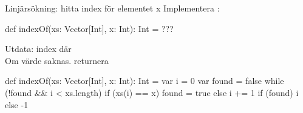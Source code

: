 %

\begin{Slide}{Linjärsökning: hitta index för elementet x}
Implementera :
\begin{Code}
def indexOf(xs: Vector[Int], x: Int): Int = ???
\end{Code}
Utdata: index  där \\Om värde saknas. returnera 
\pause
\begin{Code}
def indexOf(xs: Vector[Int], x: Int): Int = {
  var i = 0
  var found = false
  while (!found && i < xs.length) {
    if (xs(i) == x) found = true
    else i += 1
  }
  if (found) i else -1
}
\end{Code}
\end{Slide}

